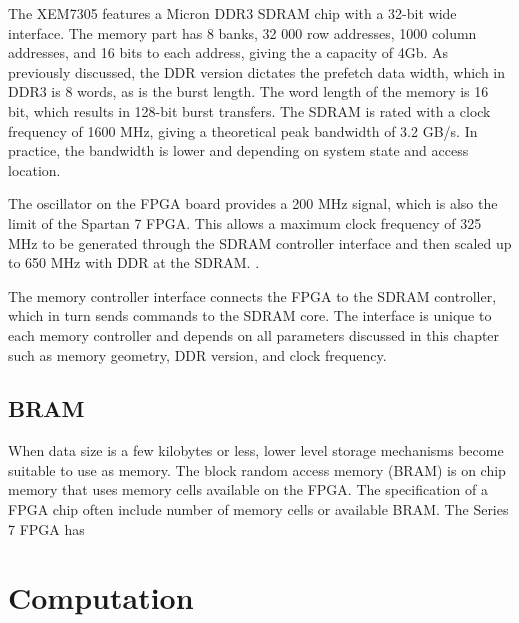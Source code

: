 \documentclass[12pt]{report}
\begin{document}
\par
The XEM7305 features a Micron DDR3 SDRAM chip with a 32-bit wide interface. The memory part has 8 banks, 32 000 row addresses, 1000 column addresses, and 16 bits to each address, giving the a capacity of 4Gb. As previously discussed, the DDR version dictates the prefetch data width, which in DDR3 is 8 words, as is the burst length. The word length of the memory is 16 bit, which results in 128-bit burst transfers. The SDRAM is rated with a clock frequency of 1600 MHz, giving a theoretical peak bandwidth of 3.2 GB/s. In practice, the bandwidth is lower and depending on system state and access location.
\par
The oscillator on the FPGA board provides a 200 MHz signal, which is also the limit of the Spartan 7 FPGA. This allows a maximum clock frequency of 325 MHz to be generated through the SDRAM controller interface and then scaled up to 650 MHz with DDR at the SDRAM.
\citep{XEM7305Man} \citep{MicronSDRAM}.
\par
The memory controller interface connects the FPGA to the SDRAM controller, which in turn sends commands to the SDRAM core. The interface is unique to each memory controller and depends on all parameters discussed in this chapter such as memory geometry, DDR version, and clock frequency.




\subsection{BRAM}
When data size is a few kilobytes or less, lower level storage mechanisms become suitable to use as memory. The block random access memory (BRAM) is on chip memory that uses memory cells available on the FPGA. The specification of a FPGA chip often include number of memory cells or available BRAM. The Series 7 FPGA has 

\section{Computation}
\end{document}
